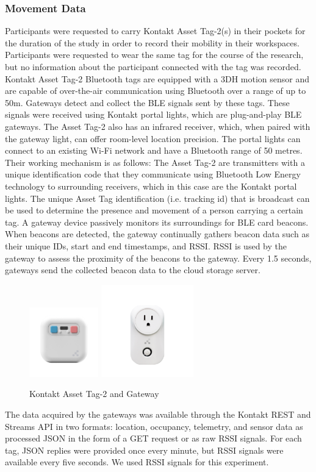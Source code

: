 \documentclass[acmtog]{acmart}
\begin{document}
\subsubsection{Movement Data}
Participants were requested to carry Kontakt Asset Tag-2(s) in their pockets for the duration of the study in order to record their mobility in their workspaces. Participants were requested to wear the same tag for the course of the research, but no information about the participant connected with the tag was recorded. Kontakt Asset Tag-2 Bluetooth tags are equipped with a 3DH motion sensor and are capable of over-the-air communication using Bluetooth over a range of up to 50m. Gateways detect and collect the BLE signals sent by these tags. These signals were received using Kontakt portal lights, which are plug-and-play BLE gateways. The Asset Tag-2 also has an infrared receiver, which, when paired with the gateway light, can offer room-level location precision. The portal lights can connect to an existing Wi-Fi network and have a Bluetooth range of 50 metres. Their working mechanism is as follows:
The Asset Tag-2 are transmitters with a unique identification code that they communicate using Bluetooth Low Energy technology to surrounding receivers, which in this case are the Kontakt portal lights. The unique Asset Tag identification (i.e. tracking id) that is broadcast can be used to determine the presence and movement of a person carrying a certain tag. A gateway device passively monitors its surroundings for BLE card beacons. When beacons are detected, the gateway continually gathers beacon data such as their unique IDs, start and end timestamps, and RSSI. RSSI is used by the gateway to assess the proximity of the beacons to the gateway. Every 1.5 seconds, gateways send the collected beacon data to the cloud storage server. 
\begin{figure}[h]
  \centering
  \includegraphics[width=3cm,height=3cm,keepaspectratio]{Asset-Tag-493x0-c-default}
  \includegraphics[width=4cm,height=4cm,keepaspectratio]{Group-15446-493x0-c-default}
  \caption{Kontakt Asset Tag-2 and Gateway}
  \end{figure}
The data acquired by the gateways was available through the Kontakt REST and Streams API in two formats: location, occupancy, telemetry, and sensor data as processed JSON in the form of a GET request or as raw RSSI signals. For each tag, JSON replies were provided once every minute, but RSSI signals were available every five seconds. We used RSSI signals for this experiment.
\end{document}
